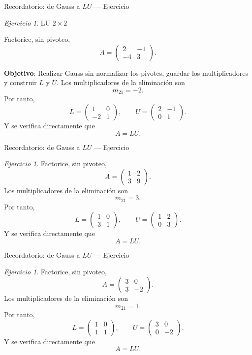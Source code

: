 \documentclass[aspectratio=169,11pt]{beamer}
\theoremstyle{remark}
\newtheorem{Ejer}[definicion]{Ejercicio}
\begin{document}
\begin{frame}[shrink=5]{Recordatorio: de Gauss a $LU$ — Ejercicio}
\footnotesize
\begin{Ejer} LU $2\times 2$

Factorice, sin pivoteo,
\[
A=\begin{pmatrix}2 & -1\\-4 & 3\end{pmatrix}.
\]

\textbf{Objetivo}: Realizar Gauss sin normalizar los pivotes, guardar los multiplicadores y construir $L$ y $U$.
 Los multiplicadores de la eliminación son
\[
m_{21}=-2.
\]
Por tanto,
\[
L=\begin{pmatrix}1 & 0\\-2 & 1\end{pmatrix},\qquad U=\begin{pmatrix}2 & -1\\0 & 1\end{pmatrix}.
\]
Y se verifica directamente que
\[
\boxed{A=LU}.
\]
\end{Ejer}
\end{frame}

\begin{frame}[shrink=5]{Recordatorio: de Gauss a $LU$ — Ejercicio}
\footnotesize
\begin{Ejer} 

Factorice, sin pivoteo,
\[
A=\begin{pmatrix}1 & 2\\3 & 9\end{pmatrix}.
\]
 Los multiplicadores de la eliminación son
\[
m_{21}=3.
\]
Por tanto,
\[
L=\begin{pmatrix}1 & 0\\3 & 1\end{pmatrix},\qquad U=\begin{pmatrix}1 & 2\\0 & 3\end{pmatrix}.
\]
Y se verifica directamente que
\[
\boxed{A=LU}.
\]

\end{Ejer}
\end{frame}

\begin{frame}[shrink=5]{Recordatorio: de Gauss a $LU$ — Ejercicio}
\footnotesize
\begin{Ejer}
Factorice, sin pivoteo,
\[
A=\begin{pmatrix}3 & 0\\3 & -2\end{pmatrix}.
\]
 Los multiplicadores de la eliminación son
\[
m_{21}=1.
\]
Por tanto,
\[
L=\begin{pmatrix}1 & 0\\1 & 1\end{pmatrix},\qquad U=\begin{pmatrix}3 & 0\\0 & -2\end{pmatrix}.
\]
Y se verifica directamente que
\[
\boxed{A=LU}.
\]
\end{Ejer}
\end{frame}
\end{document}
